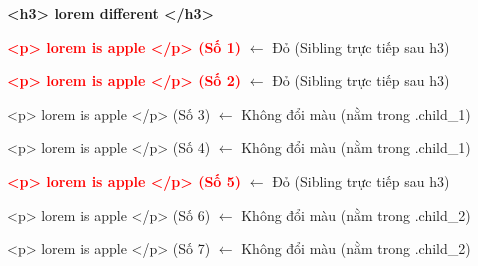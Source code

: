 \begin{browserWindow}
\sffamily\small
\begin{tcolorbox}[arc=2pt, colback=primaryBlue!5, colframe=primaryBlue!40, boxrule=1pt, title={\sffamily\small\color{white}\textbf{.Parent}}, colbacktitle=primaryBlue!70]
{\bfseries\large\textcolor{darkText}{<h3> lorem different </h3>}} \par\vspace{4pt}
\textcolor{red}{\textbf{<p> lorem is apple </p> (Số 1)}} {\small\textcolor{gray!60}{$\leftarrow$ Đỏ (Sibling trực tiếp sau h3)}} \par\vspace{2pt}
\textcolor{red}{\textbf{<p> lorem is apple </p> (Số 2)}} {\small\textcolor{gray!60}{$\leftarrow$ Đỏ (Sibling trực tiếp sau h3)}} \par\vspace{3pt}
\begin{tcolorbox}[arc=2pt, colback=white, colframe=gray!30, boxrule=1pt, title={\sffamily\scriptsize\color{darkText}.child\_1}]
\textcolor{darkText}{<p> lorem is apple </p> (Số 3)} {\small\textcolor{gray!60}{$\leftarrow$ Không đổi màu (nằm trong .child\_1)}} \par\vspace{2pt}
\textcolor{darkText}{<p> lorem is apple </p> (Số 4)} {\small\textcolor{gray!60}{$\leftarrow$ Không đổi màu (nằm trong .child\_1)}}
\end{tcolorbox}\vspace{3pt}
\textcolor{red}{\textbf{<p> lorem is apple </p> (Số 5)}} {\small\textcolor{gray!60}{$\leftarrow$ Đỏ (Sibling trực tiếp sau h3)}} \par\vspace{3pt}
\begin{tcolorbox}[arc=2pt, colback=white, colframe=gray!30, boxrule=1pt, title={\sffamily\scriptsize\color{darkText}.child\_2}]
\textcolor{darkText}{<p> lorem is apple </p> (Số 6)} {\small\textcolor{gray!60}{$\leftarrow$ Không đổi màu (nằm trong .child\_2)}} \par\vspace{2pt}
\textcolor{darkText}{<p> lorem is apple </p> (Số 7)} {\small\textcolor{gray!60}{$\leftarrow$ Không đổi màu (nằm trong .child\_2)}}
\end{tcolorbox}
\end{tcolorbox}
\end{browserWindow}

